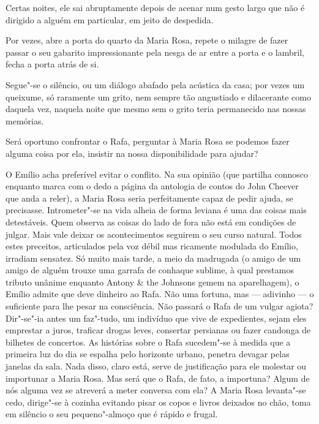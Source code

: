 Certas noites, ele sai abruptamente depois de acenar num gesto largo que
não é dirigido a alguém em particular, em jeito de despedida.

Por vezes, abre a porta do quarto da Maria Rosa, repete o milagre de
fazer passar o seu gabarito impressionante pela nesga de ar entre a
porta e o lambril, fecha a porta atrás de si.

Segue"-se o silêncio, ou um diálogo abafado pela acústica da casa; por
vezes um queixume, só raramente um grito, nem sempre tão angustiado e
dilacerante como daquela vez, naquela noite que mesmo sem o grito
teria permanecido nas nossas memórias.

Será oportuno confrontar o Rafa, perguntar à Maria Rosa se podemos fazer
alguma coisa por ela, insistir na nossa disponibilidade para ajudar?

O Emílio acha preferível evitar o conflito. Na sua opinião (que
partilha connosco enquanto marca com o dedo a página da antologia de
contos do John Cheever que anda a reler), a Maria Rosa seria
perfeitamente capaz de pedir ajuda, se precisasse. Intrometer"-se na vida
alheia de forma leviana é uma das coisas mais detestáveis. Quem observa
as coisas do lado de fora não está em condições de julgar. Mais vale
deixar os acontecimentos seguirem o seu curso natural. Todos estes
preceitos, articulados pela voz débil mas ricamente modulada do
Emílio, irradiam sensatez. Só muito mais tarde, a meio da madrugada (o
amigo de um amigo de alguém trouxe uma garrafa de conhaque sublime, à
qual prestamos tributo unânime enquanto Antony \& the Johnsons gemem
na aparelhagem), o Emílio admite que deve dinheiro ao Rafa. Não uma
fortuna, mas --- adivinho --- o suficiente para lhe pesar na
consciência. Não passará o Rafa de um vulgar agiota? Dir"-se"-ia antes um
faz"-tudo, um indivíduo
que vive de expedientes, sejam eles emprestar a juros, traficar drogas
leves, consertar persianas ou fazer candonga de bilhetes de concertos.
As histórias sobre o Rafa sucedem"-se à medida que a primeira luz do dia
se espalha pelo horizonte urbano, penetra devagar pelas janelas da sala.
Nada disso, claro está, serve de justificação para ele molestar ou
importunar a Maria Rosa. Mas será que o Rafa, de fato, a importuna?
Algum de nós alguma vez se atreverá a meter conversa com ela? A Maria
Rosa levanta"-se cedo, dirige"-se à cozinha evitando pisar os copos e
livros deixados no chão, toma em silêncio o seu pequeno"-almoço que é
rápido e frugal.


\medskip
\asterisc
\medskip

